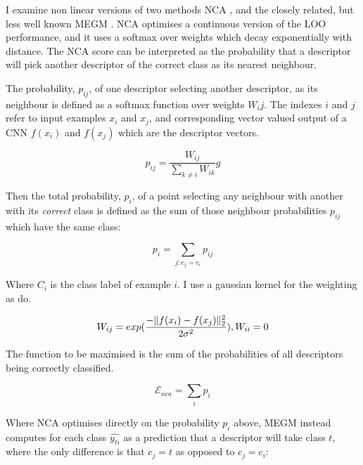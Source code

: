 I examine non linear versions of two methods \gls{NCA} \cite{Goldberger2004}, and the closely related, but less well known \gls{MEGM} \cite {Zaidi2011}. \gls{NCA} optimises a continuous version of the \gls{LOO} performance, and it uses a softmax over weights which decay exponentially with distance. The \gls{NCA} score can be interpreted as the probability that a descriptor will pick another descriptor of the correct class as its nearest neighbour. 

The probability, $ p_{ij} $, of one descriptor selecting another descriptor, as its neighbour is defined as a softmax function over weights $W_ij$. The indexes $ i $ and $ j $ refer to input examples $x_i$ and $x_j$, and corresponding vector valued output of a \gls{CNN} $f(x_i)$ and $f(x_j)$ which are the descriptor vectors.

\begin{equation}
\label{eq:nca_prob_pair}
p_{ij} =  \frac {W_{ij}} {\sum_{k \neq i}{W_{ik}}}g
\end{equation}

Then the total probability, $ p_i $, of a point selecting any neighbour with another with its \emph{correct} class is defined as the sum of those neighbour probabilities $p_{ij}$ which have the same class:

\begin{equation}
\label{eq:nca_prob}
p_{i} =  \sum_{j:c_j = c_i}{p_{ij}}
\end{equation}

Where $ C_i $ is the class label of example $ i $. I use a gaussian kernel for the weighting as \cite{Zaidi2011} do. 

\begin{equation}
 \label{eq:gaussian_kernel}
W_{ij} = exp(\frac{-\lVert f(x_i) - f(x_j) \rVert^2_2 }{2\sigma^2}), \space W_{ii} = 0
\end{equation}


The function to be maximised is the sum of the probabilities of all descriptors being correctly classified.

\begin{equation}
\label{eq:nca_loss}
\mathcal{E}_{nca} =  \sum_i {p_i}
\end{equation}

Where \gls{NCA} optimises directly on the probability $ p_{i} $ above, \gls{MEGM} instead computes for each class $ \hat{y_{ti}} $ as a prediction that a descriptor will take class $ t $, where the only difference is that $ c_j = t $ as opposed to $ c_j = c_i $:

